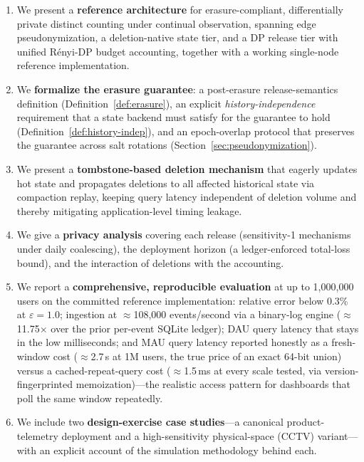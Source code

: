 \documentclass[sigconf,anonymous,review]{acmart}
\begin{document}
\begin{enumerate}
    \item We present a \textbf{reference architecture} for erasure-compliant, differentially private distinct counting under continual observation, spanning edge pseudonymization, a deletion-native state tier, and a DP release tier with unified R\'enyi-DP budget accounting, together with a working single-node reference implementation.

    \item We \textbf{formalize the erasure guarantee}: a post-erasure release-semantics definition (Definition~\ref{def:erasure}), an explicit \emph{history-independence} requirement that a state backend must satisfy for the guarantee to hold (Definition~\ref{def:history-indep}), and an epoch-overlap protocol that preserves the guarantee across salt rotations (Section~\ref{sec:pseudonymization}).

    \item We present a \textbf{tombstone-based deletion mechanism} that eagerly updates hot state and propagates deletions to all affected historical state via compaction replay, keeping query latency independent of deletion volume and thereby mitigating application-level timing leakage.

    \item We give a \textbf{privacy analysis} covering each release (sensitivity-1 mechanisms under daily coalescing), the deployment horizon (a ledger-enforced total-loss bound), and the interaction of deletions with the accounting.

    \item We report a \textbf{comprehensive, reproducible evaluation} at up to 1{,}000{,}000 users on the committed reference implementation: relative error below 0.3\% at $\varepsilon = 1.0$; ingestion at $\approx$108{,}000 events/second via a binary-log engine ($\approx$11.75$\times$ over the prior per-event SQLite ledger); DAU query latency that stays in the low milliseconds; and MAU query latency reported honestly as a fresh-window cost ($\approx$2.7\,s at 1M users, the true price of an exact 64-bit union) versus a cached-repeat-query cost ($\approx$1.5\,ms at every scale tested, via version-fingerprinted memoization)---the realistic access pattern for dashboards that poll the same window repeatedly.

    \item We include two \textbf{design-exercise case studies}---a canonical product-telemetry deployment and a high-sensitivity physical-space (CCTV) variant---with an explicit account of the simulation methodology behind each.
\end{enumerate}
\end{document}
